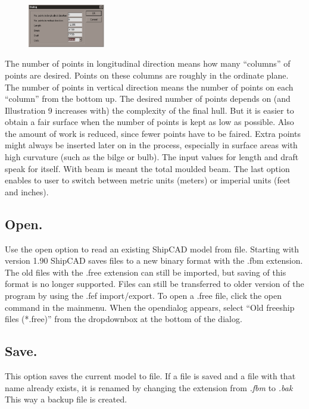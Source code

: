 \documentclass[12pt]{article}
\begin{document}
\begin{figure}
        \centering
        \includegraphics[width=0.3\textwidth,natwidth=401,natheight=223]{filenewdialog.png}
        \caption{}
        \label{fig:filenew}
\end{figure}

The number of points in longitudinal direction means how many
“columns” of points are desired. Points on these columns are roughly
in the ordinate plane.  The number of points in vertical direction
means the number of points on each “column” from the bottom up. The
desired number of points depends on (and Illustration 9 increases
with) the complexity of the final hull. But it is easier to obtain a
fair surface when the number of points is kept as low as
possible. Also the amount of work is reduced, since fewer points have
to be faired. Extra points might always be inserted later on in the
process, especially in surface areas with high curvature (such as the
bilge or bulb). The input values for length and draft speak for
itself. With beam is meant the total moulded beam. The last option
enables to user to switch between metric units (meters) or imperial
units (feet and inches).

\subsection{Open.}
Use the open option to read an existing ShipCAD model from
file. Starting with version 1.90 ShipCAD saves files to a new binary
format with the .fbm extension. The old files with the .free extension
can still be imported, but saving of this format is no longer
supported. Files can still be transferred to older version of the
program by using the .fef import/export. To open a .free file, click
the open command in the mainmenu. When the opendialog appears, select
``Old freeship files (*.free)'' from the dropdownbox at the bottom of
the dialog.

\subsection{Save.}
This option saves the current model to file. If a file is saved and a
file with that name already exists, it is renamed by changing the
extension from \textit{.fbm} to \textit{.bak} This way a backup file is created.
\end{document}

